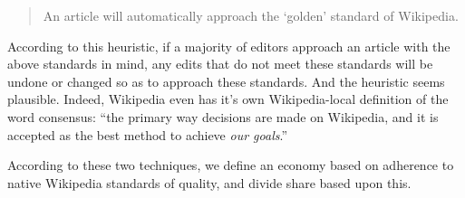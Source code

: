 \begin{quote}
  An article will automatically approach the `golden' standard of
  Wikipedia.
\end{quote}

According to this heuristic, if a majority of editors approach an
article with the above standards in mind, any edits that do not meet
these standards will be undone or changed so as to approach these
standards. And the heuristic seems plausible. Indeed, Wikipedia even
has it's own Wikipedia-local definition of the word consensus: ``the
primary way decisions are made on Wikipedia, and it is accepted as the
best method to achieve \textit{our goals}.''\cite{wiki-consensus}

According to these two techniques, we define an economy based on
adherence to native Wikipedia standards of quality, and divide share
based upon this. 
